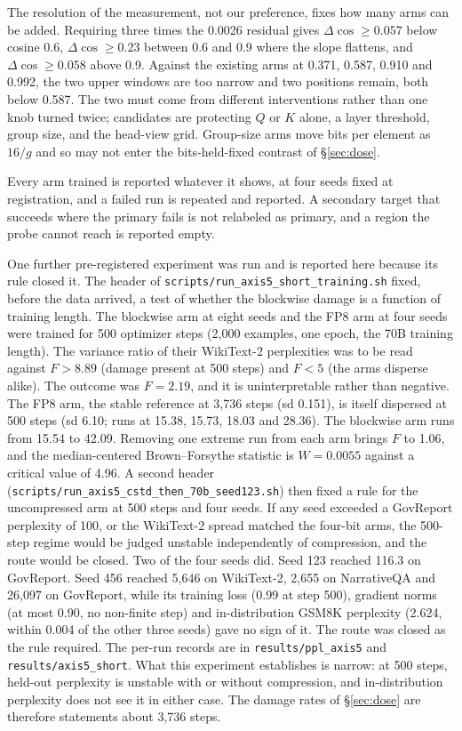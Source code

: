 \documentclass[11pt,letterpaper]{article}
\begin{document}
\medskip
The resolution of the measurement, not our preference, fixes how many arms can be added. Requiring three times the 0.0026 residual gives $\Delta\cos \geq 0.057$ below cosine 0.6, $\Delta\cos \geq 0.23$ between 0.6 and 0.9 where the slope flattens, and $\Delta\cos \geq 0.058$ above 0.9. Against the existing arms at 0.371, 0.587, 0.910 and 0.992, the two upper windows are too narrow and two positions remain, both below 0.587. The two must come from different interventions rather than one knob turned twice; candidates are protecting $Q$ or $K$ alone, a layer threshold, group size, and the head-view grid. Group-size arms move bits per element as $16/g$ and so may not enter the bits-held-fixed contrast of \S\ref{sec:dose}.

\medskip
Every arm trained is reported whatever it shows, at four seeds fixed at registration, and a failed run is repeated and reported. A secondary target that succeeds where the primary fails is not relabeled as primary, and a region the probe cannot reach is reported empty.

\medskip
One further pre-registered experiment was run and is reported here because its rule closed it. The header of \texttt{scripts/run\_axis5\_short\_training.sh} fixed, before the data arrived, a test of whether the blockwise damage is a function of training length. The blockwise arm at eight seeds and the FP8 arm at four seeds were trained for 500 optimizer steps (2{,}000 examples, one epoch, the 70B training length). The variance ratio of their WikiText-2 perplexities was to be read against $F > 8.89$ (damage present at 500 steps) and $F < 5$ (the arms disperse alike). The outcome was $F = 2.19$, and it is uninterpretable rather than negative. The FP8 arm, the stable reference at 3{,}736 steps (sd 0.151), is itself dispersed at 500 steps (sd 6.10; runs at 15.38, 15.73, 18.03 and 28.36). The blockwise arm runs from 15.54 to 42.09. Removing one extreme run from each arm brings $F$ to 1.06, and the median-centered Brown--Forsythe statistic is $W = 0.0055$ against a critical value of 4.96. A second header (\texttt{scripts/run\_axis5\_cstd\_then\_70b\_seed123.sh}) then fixed a rule for the uncompressed arm at 500 steps and four seeds. If any seed exceeded a GovReport perplexity of 100, or the WikiText-2 spread matched the four-bit arms, the 500-step regime would be judged unstable independently of compression, and the route would be closed. Two of the four seeds did. Seed 123 reached 116.3 on GovReport. Seed 456 reached 5{,}646 on WikiText-2, 2{,}655 on NarrativeQA and 26{,}097 on GovReport, while its training loss (0.99 at step 500), gradient norms (at most 0.90, no non-finite step) and in-distribution GSM8K perplexity (2.624, within 0.004 of the other three seeds) gave no sign of it. The route was closed as the rule required. The per-run records are in \texttt{results/ppl\_axis5} and \texttt{results/axis5\_short}. What this experiment establishes is narrow: at 500 steps, held-out perplexity is unstable with or without compression, and in-distribution perplexity does not see it in either case. The damage rates of \S\ref{sec:dose} are therefore statements about 3{,}736 steps.
\end{document}
